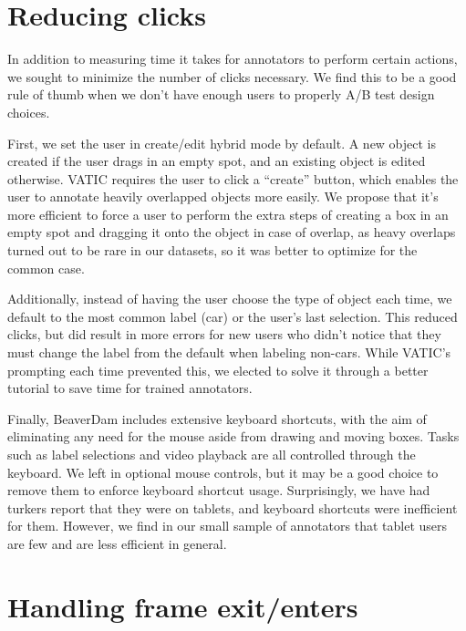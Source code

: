 \section{Reducing clicks}

In addition to measuring time it takes for annotators to perform certain actions, we sought to minimize the number of clicks necessary.
We find this to be a good rule of thumb when we don't have enough users to properly A/B test design choices.

First, we set the user in create/edit hybrid mode by default.
A new object is created if the user drags in an empty spot, and an existing object is edited otherwise.
VATIC requires the user to click a ``create'' button, which enables the user to annotate heavily overlapped objects more easily.
We propose that it's more efficient to force a user to perform the extra steps of creating a box in an empty spot and dragging it onto the object in case of overlap,
as heavy overlaps turned out to be rare in our datasets, so it was better to optimize for the common case.

Additionally, instead of having the user choose the type of object each time, we default to the most common label (car) or the user's last selection.
This reduced clicks, but did result in more errors for new users who didn't notice that they must change the label from the default when labeling non-cars.
While VATIC's prompting each time prevented this, we elected to solve it through a better tutorial to save time for trained annotators.

Finally, BeaverDam includes extensive keyboard shortcuts, with the aim of eliminating any need for the mouse aside from drawing and moving boxes.
Tasks such as label selections and video playback are all controlled through the keyboard.
We left in optional mouse controls, but it may be a good choice to remove them to enforce keyboard shortcut usage.
Surprisingly, we have had turkers report that they were on tablets, and keyboard shortcuts were inefficient for them.
However, we find in our small sample of annotators that tablet users are few and are less efficient in general.

\section{Handling frame exit/enters}

